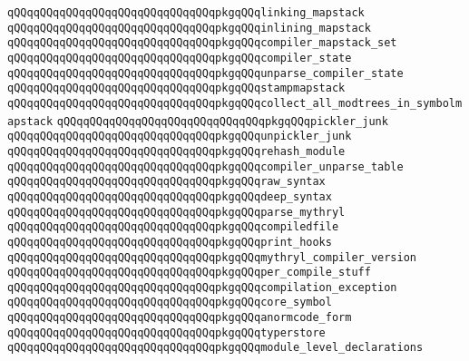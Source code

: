 \verb|qQQqqQQqqQQqqQQqqQQqqQQqqQQqqQQqpkgqQQqlinking_mapstack|\newline
\verb|qQQqqQQqqQQqqQQqqQQqqQQqqQQqqQQqpkgqQQqinlining_mapstack|\newline
\verb|qQQqqQQqqQQqqQQqqQQqqQQqqQQqqQQqpkgqQQqcompiler_mapstack_set|\newline
\verb|qQQqqQQqqQQqqQQqqQQqqQQqqQQqqQQqpkgqQQqcompiler_state|\newline
\verb|qQQqqQQqqQQqqQQqqQQqqQQqqQQqqQQqpkgqQQqunparse_compiler_state|\newline
\verb|qQQqqQQqqQQqqQQqqQQqqQQqqQQqqQQqpkgqQQqstampmapstack|\newline
\verb|qQQqqQQqqQQqqQQqqQQqqQQqqQQqqQQqpkgqQQqcollect_all_modtrees_in_symbolmapstack|\newline
\verb|qQQqqQQqqQQqqQQqqQQqqQQqqQQqqQQqpkgqQQqpickler_junk|\newline
\verb|qQQqqQQqqQQqqQQqqQQqqQQqqQQqqQQqpkgqQQqunpickler_junk|\newline
\verb|qQQqqQQqqQQqqQQqqQQqqQQqqQQqqQQqpkgqQQqrehash_module|\newline
\verb|qQQqqQQqqQQqqQQqqQQqqQQqqQQqqQQqpkgqQQqcompiler_unparse_table|\newline
\verb|qQQqqQQqqQQqqQQqqQQqqQQqqQQqqQQqpkgqQQqraw_syntax|\newline
\verb|qQQqqQQqqQQqqQQqqQQqqQQqqQQqqQQqpkgqQQqdeep_syntax|\newline
\verb|qQQqqQQqqQQqqQQqqQQqqQQqqQQqqQQqpkgqQQqparse_mythryl|\newline
\verb|qQQqqQQqqQQqqQQqqQQqqQQqqQQqqQQqpkgqQQqcompiledfile|\newline
\verb|qQQqqQQqqQQqqQQqqQQqqQQqqQQqqQQqpkgqQQqprint_hooks|\newline
\verb|qQQqqQQqqQQqqQQqqQQqqQQqqQQqqQQqpkgqQQqmythryl_compiler_version|\newline
\verb|qQQqqQQqqQQqqQQqqQQqqQQqqQQqqQQqpkgqQQqper_compile_stuff|\newline
\verb|qQQqqQQqqQQqqQQqqQQqqQQqqQQqqQQqpkgqQQqcompilation_exception|\newline
\verb|qQQqqQQqqQQqqQQqqQQqqQQqqQQqqQQqpkgqQQqcore_symbol|\newline
\verb|qQQqqQQqqQQqqQQqqQQqqQQqqQQqqQQqpkgqQQqanormcode_form|\newline
\newline
\verb|qQQqqQQqqQQqqQQqqQQqqQQqqQQqqQQqpkgqQQqtyperstore|\newline
\verb|qQQqqQQqqQQqqQQqqQQqqQQqqQQqqQQqpkgqQQqmodule_level_declarations|\newline
